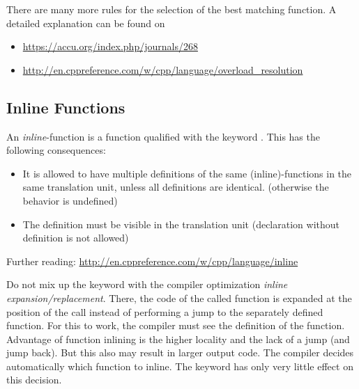 \begin{rem}
  There are many more rules for the selection of the best matching function. A detailed explanation can be found on
  \begin{itemize}
	  \item \url{https://accu.org/index.php/journals/268}
	  \item \url{http://en.cppreference.com/w/cpp/language/overload_resolution}
  \end{itemize}
\end{rem}


\subsection{Inline Functions\label{sec:inline-function}}
An \emph{inline}-function is a function qualified with the keyword . This has the following consequences:
\begin{itemize}
  \item It is allowed to have multiple definitions of the same (inline)-functions in the same translation unit, unless all definitions are identical.
        (otherwise the behavior is undefined)
  \item The definition must be visible in the translation unit (declaration without definition is not allowed)
\end{itemize}
Further reading: \url{http://en.cppreference.com/w/cpp/language/inline}

Do not mix up the keyword  with the compiler optimization \emph{inline expansion/replacement}. There, the code of the called function is
expanded at the position of the call instead of performing a jump to the separately defined function. For this to work, the compiler must see the
definition of the function. Advantage of function inlining is the higher locality and the lack of a jump (and jump back). But this also may result in
larger output code. The compiler decides automatically which function to inline. The keyword  has only very little effect on this decision.

